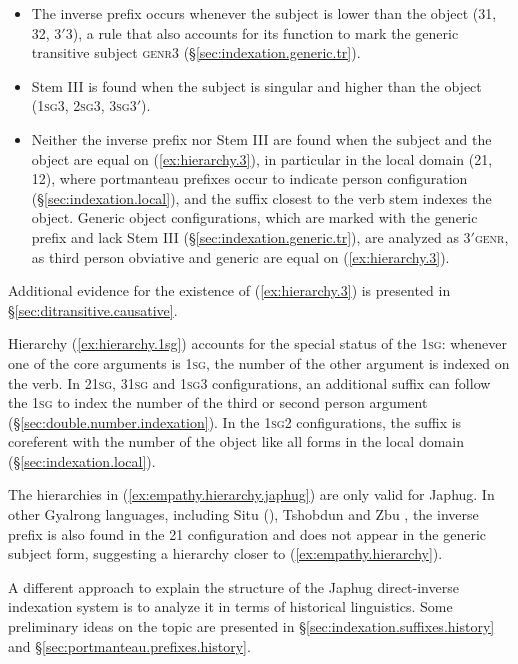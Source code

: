 \begin{itemize}
\item The inverse prefix occurs whenever the subject is lower than the object (3\fl{}1, 3\fl{}2, 3$'$\fl{}3), a rule that also accounts for its function to mark the generic transitive subject \textsc{genr}\fl{}3 (§\ref{sec:indexation.generic.tr}). 
\item Stem III is found when the subject is singular and higher than the object (\textsc{1sg}\fl{}3, \textsc{2sg}\fl{}3, \textsc{3sg}\fl{}3$'$). 
\item Neither the inverse prefix nor Stem III are found when the subject and the object are equal on (\ref{ex:hierarchy.3}), in particular in the local domain (2\fl{}1, 1\fl{}2), where portmanteau prefixes occur to indicate person configuration (§\ref{sec:indexation.local}), and the suffix closest to the verb stem indexes the object. Generic object configurations, which are marked with the  generic prefix and lack Stem III (§\ref{sec:indexation.generic.tr}), 
are analyzed as 3$'$\fl{}\textsc{genr}, as third person obviative and generic are equal on (\ref{ex:hierarchy.3}).
\end{itemize}

Additional evidence for the existence of (\ref{ex:hierarchy.3}) is presented in §\ref{sec:ditransitive.causative}.

Hierarchy (\ref{ex:hierarchy.1sg}) accounts for the special status of the \textsc{1sg}: whenever one of the core arguments is \textsc{1sg}, the number of the other argument is indexed on the verb. In 2\fl{}\textsc{1sg}, 3\fl{}\textsc{1sg} and \textsc{1sg}\fl{}3 configurations, an additional suffix can follow the  \textsc{1sg} to index the number of the third or second person argument (§\ref{sec:double.number.indexation}). In the \textsc{1sg}\fl{}2 configurations, the suffix is coreferent with the number of the object like all forms in the local domain (§\ref{sec:indexation.local}). 

The hierarchies in (\ref{ex:empathy.hierarchy.japhug}) are only valid for Japhug. In other Gyalrong languages, including Situ (\citealt{delancey81direction, jackson15sastod, zhangsy19obviative}), Tshobdun \citep{jackson02rentongdengdi} and Zbu \citep{gongxun14agreement}, the inverse prefix is also found in the 2\fl{}1 configuration and does not appear in the generic subject form, suggesting a hierarchy closer to (\ref{ex:empathy.hierarchy}).

A different approach to explain the structure of the Japhug direct-inverse indexation system is to analyze it in terms of historical linguistics. Some preliminary ideas on the topic are presented in §\ref{sec:indexation.suffixes.history} and §\ref{sec:portmanteau.prefixes.history}.




